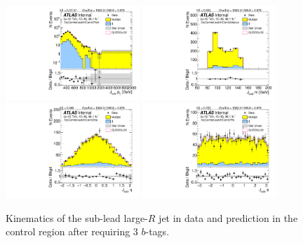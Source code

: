 \begin{figure}[htbp!]
\begin{center}
\includegraphics[width=0.45\textwidth,angle=-90]{figures/boosted/Control/b77_ThreeTag_Control_sublHCand_Pt_m_1.pdf}
\includegraphics[width=0.45\textwidth,angle=-90]{figures/boosted/Control/b77_ThreeTag_Control_sublHCand_Mass_s.pdf}\\
\includegraphics[width=0.45\textwidth,angle=-90]{figures/boosted/Control/b77_ThreeTag_Control_sublHCand_Eta.pdf}
\includegraphics[width=0.45\textwidth,angle=-90]{figures/boosted/Control/b77_ThreeTag_Control_sublHCand_Phi.pdf}
  \caption{Kinematics of the sub-lead large-$R$ jet in data and prediction in the control region after requiring 3 $b$-tags. }
  \label{fig:boosted-3b-control-ak10-subl}
\end{center}
\end{figure}

